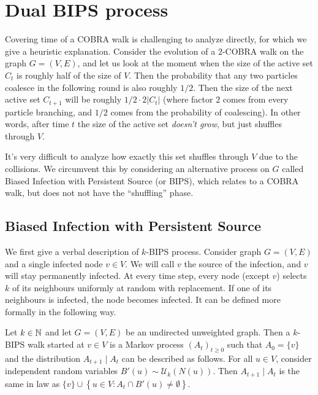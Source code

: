 \documentclass[11pt]{article}
\theoremstyle{remark}
\begin{document}


\section{Dual BIPS process}

Covering time of a COBRA walk is challenging to analyze directly, for which we give a heuristic explanation. Consider the evolution of a $2$-COBRA walk on the graph $G = (V,E)$, and let us look at the moment when the size of the active set $C_t$ is roughly half of the size of $V$. Then the probability that any two particles coalesce in the following round is also roughly $1/2$. Then the size of the next active set $C_{t+1}$ will be roughly $1/2\cdot 2|C_t|$ (where factor $2$ comes from every particle branching, and $1/2$ comes from the probability of coalescing). In other words, after time $t$ the size of the active set \emph{doesn't grow}, but just shuffles through $V$. 

It's very difficult to analyze how exactly this set shuffles through $V$ due to the collisions. We circumvent this by considering an alternative process on $G$ called Biased Infection with Persistent Source (or BIPS), which relates to a COBRA walk, but does not not have the ``shuffling'' phase. 

\subsection{Biased Infection with Persistent Source}

We first give a verbal description of $k$-BIPS process. Consider graph $G = (V,E)$ and a single infected node $v \in V$. We will call $v$ the source of the infection, and $v$ will stay permanently infected. At every time step, every node (except $v$) selects $k$ of its neighbours uniformly at random with replacement. If one of its neighbours is infected, the node becomes infected. It can be defined more formally in the following way.

\begin{definition}
\label{def:bips}
    Let $k\in \mathbb N$ and let $G = (V,E)$ be an undirected unweighted graph. 
    Then a $k$-BIPS walk started at $v \in V$ is a Markov process $(A_t)_{t\ge0}$ such that $A_0 = \{v\}$ and the distribution $A_{t+1} \mid A_t$ can be described as follows. For all $u \in V$, consider independent random variables $B'(u) \sim \mathcal U_k(N(u))$. Then $A_{t+1} \mid A_t$ is the same in law as $\{v\} \cup \left\{u \in V: A_t \cap B'(u)\not = \emptyset \right\}$.
 \end{definition}
\end{document}
